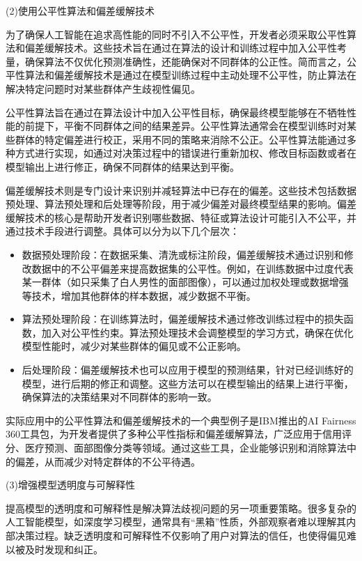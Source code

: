 (2)使用公平性算法和偏差缓解技术

为了确保人工智能在追求高性能的同时不引入不公平性，开发者必须采取公平性算法和偏差缓解技术。这些技术旨在通过在算法的设计和训练过程中加入公平性考量，确保算法不仅优化预测准确性，还能确保对不同群体的公正性。简而言之，公平性算法和偏差缓解技术是通过在模型训练过程中主动处理不公平性，防止算法在解决特定问题时对某些群体产生歧视性偏见。

公平性算法旨在通过在算法设计中加入公平性目标，确保最终模型能够在不牺牲性能的前提下，平衡不同群体之间的结果差异。公平性算法通常会在模型训练时对某些群体的特定偏差进行校正，采用不同的策略来消除不公正。公平性算法能通过多种方式进行实现，如通过对决策过程中的错误进行重新加权、修改目标函数或者在模型输出上进行修正，确保不同群体的结果达到平衡。

偏差缓解技术则是专门设计来识别并减轻算法中已存在的偏差。这些技术包括数据预处理、算法预处理和后处理等阶段，用于减少偏差对最终模型结果的影响。偏差缓解技术的核心是帮助开发者识别哪些数据、特征或算法设计可能引入不公平，并通过技术手段进行调整。具体可以分为以下几个层次：
\begin{itemize}
    \item 数据预处理阶段：在数据采集、清洗或标注阶段，偏差缓解技术通过识别和修改数据中的不公平偏差来提高数据集的公平性。例如，在训练数据中过度代表某一群体（如只采集了白人男性的面部图像），可以通过加权处理或数据增强等技术，增加其他群体的样本数据，减少数据不平衡。
    \item 算法预处理阶段：在训练算法时，偏差缓解技术通过修改训练过程中的损失函数，加入对公平性约束。算法预处理技术会调整模型的学习方式，确保在优化模型性能时，减少对某些群体的偏见或不公正影响。
    \item 后处理阶段：偏差缓解技术也可以应用于模型的预测结果，针对已经训练好的模型，进行后期的修正和调整。这些方法可以在模型输出的结果上进行平衡，确保算法的决策结果对不同群体的影响一致。
\end{itemize}

实际应用中的公平性算法和偏差缓解技术的一个典型例子是IBM推出的AI Fairness 360工具包，为开发者提供了多种公平性指标和偏差缓解算法，广泛应用于信用评分、医疗预测、面部图像分类等领域。通过这些工具，企业能够识别和消除算法中的偏差，从而减少对特定群体的不公平待遇。

(3)增强模型透明度与可解释性

提高模型的透明度和可解释性是解决算法歧视问题的另一项重要策略。很多复杂的人工智能模型，如深度学习模型，通常具有“黑箱”性质，外部观察者难以理解其内部决策过程。缺乏透明度和可解释性不仅影响了用户对算法的信任，也使得偏见难以被及时发现和纠正。

